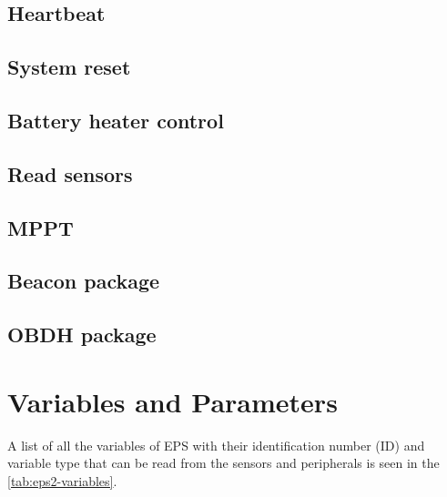 \subsection{Heartbeat}

\subsection{System reset}

\subsection{Battery heater control}

\subsection{Read sensors}

\subsection{MPPT}

\subsection{Beacon package}

\subsection{OBDH package}

\section{Variables and Parameters}

A list of all the variables of EPS with their identification number (ID) and variable type that can be read from the sensors and peripherals is seen in the \autoref{tab:eps2-variables}.

